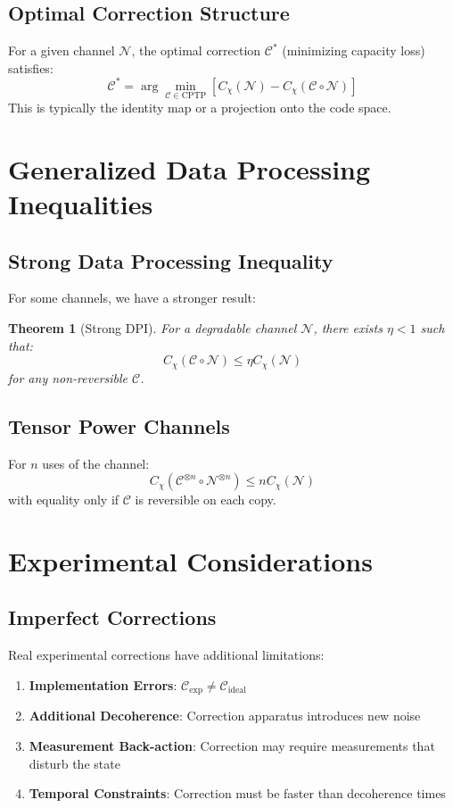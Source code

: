 \documentclass[12pt]{article}
\newtheorem{theorem}{Theorem}
\begin{document}
\subsection{Optimal Correction Structure}
For a given channel $\mathcal{N}$, the optimal correction $\mathcal{C}^*$ (minimizing capacity loss) satisfies:
\[
\mathcal{C}^* = \arg\min_{\mathcal{C} \in \text{CPTP}} \left[ C_{\chi}(\mathcal{N}) - C_{\chi}(\mathcal{C} \circ \mathcal{N}) \right]
\]
This is typically the identity map or a projection onto the code space.

\section{Generalized Data Processing Inequalities}

\subsection{Strong Data Processing Inequality}
For some channels, we have a stronger result:
\begin{theorem}[Strong DPI]
For a degradable channel $\mathcal{N}$, there exists $\eta < 1$ such that:
\[
C_{\chi}(\mathcal{C} \circ \mathcal{N}) \leq \eta C_{\chi}(\mathcal{N})
\]
for any non-reversible $\mathcal{C}$.
\end{theorem}

\subsection{Tensor Power Channels}
For $n$ uses of the channel:
\[
C_{\chi}(\mathcal{C}^{\otimes n} \circ \mathcal{N}^{\otimes n}) \leq n C_{\chi}(\mathcal{N})
\]
with equality only if $\mathcal{C}$ is reversible on each copy.

\section{Experimental Considerations}

\subsection{Imperfect Corrections}
Real experimental corrections have additional limitations:
\begin{enumerate}
    \item \textbf{Implementation Errors}: $\mathcal{C}_{\text{exp}} \neq \mathcal{C}_{\text{ideal}}$
    \item \textbf{Additional Decoherence}: Correction apparatus introduces new noise
    \item \textbf{Measurement Back-action}: Correction may require measurements that disturb the state
    \item \textbf{Temporal Constraints}: Correction must be faster than decoherence times
\end{enumerate}
\end{document}
